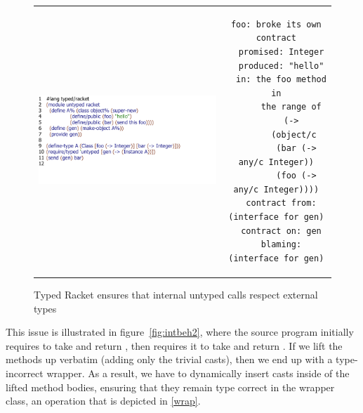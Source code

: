 \documentclass[a4paper,USenglish]{tex/lipics-v2016}
\begin{document}
\begin{figure}
\begin{tabular}{cc}
\includegraphics[scale=.7]{figures/internal.pdf}&\hspace{-2cm}
\begin{minipage}{.5\textwidth}
\vspace{-4.3cm}
\tiny
\begin{lstlisting}[basicstyle=\scriptsize\ttfamily]
foo: broke its own contract
  promised: Integer
  produced: "hello"
  in: the foo method in
      the range of
      (->
       (object/c
        (bar (-> any/c Integer))
        (foo (-> any/c Integer))))
  contract from: (interface for gen)
  contract on: gen
  blaming: (interface for gen)
\end{lstlisting}
\end{minipage}
\end{tabular}
\caption{Typed Racket ensures that internal untyped calls respect external types}
\label{fig:arktex3}
\end{figure}

This issue is illustrated in figure~\ref{fig:intbeh2}, where the source program
initially requires \n to take  and return , then requires it to take
and return . If we lift the methods up verbatim (adding only the trivial
casts), then we end up with a type-incorrect wrapper. As a result, we have to
dynamically insert casts inside of the lifted method bodies, ensuring that they
remain type correct in the wrapper class, an operation that is depicted in
\ref{wrap}.
\end{document}
